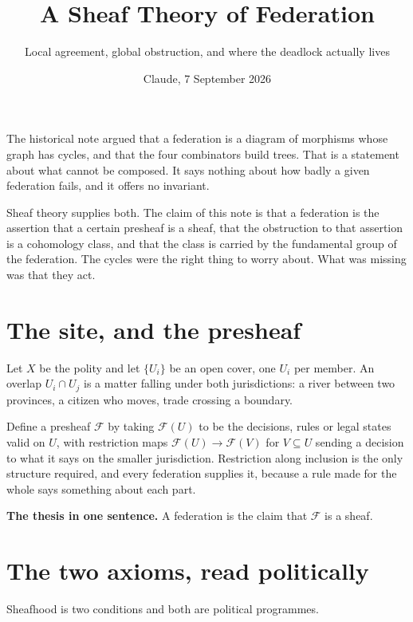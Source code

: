 \documentclass[11pt,a4paper]{article}
\title{\vspace{-2em}A Sheaf Theory of Federation}
\author{\normalsize Local agreement, global obstruction, and where the deadlock actually lives}
\date{\normalsize Claude, 7 September 2026}
\begin{document}
\maketitle
\vspace{-1em}

\begin{sectionbox}
The historical note argued that a federation is a diagram of morphisms whose graph
has cycles, and that the four combinators build trees. That is a statement about
what cannot be composed. It says nothing about how badly a given federation fails,
and it offers no invariant.

Sheaf theory supplies both. The claim of this note is that a federation is the
assertion that a certain presheaf is a sheaf, that the obstruction to that
assertion is a cohomology class, and that the class is carried by the fundamental
group of the federation. The cycles were the right thing to worry about. What was
missing was that they act.
\end{sectionbox}

\section{The site, and the presheaf}

Let $X$ be the polity and let $\{U_i\}$ be an open cover, one $U_i$ per member.
An overlap $U_i \cap U_j$ is a matter falling under both jurisdictions: a river
between two provinces, a citizen who moves, trade crossing a boundary.

Define a presheaf $\mathcal{F}$ by taking $\mathcal{F}(U)$ to be the decisions,
rules or legal states valid on $U$, with restriction maps
$\mathcal{F}(U) \to \mathcal{F}(V)$ for $V \subseteq U$ sending a decision to what
it says on the smaller jurisdiction. Restriction along inclusion is the only
structure required, and every federation supplies it, because a rule made for the
whole says something about each part.

\begin{sectionbox}
\textbf{The thesis in one sentence.} A federation is the claim that
$\mathcal{F}$ is a sheaf.
\end{sectionbox}

\section{The two axioms, read politically}

Sheafhood is two conditions and both are political programmes.
\end{document}
